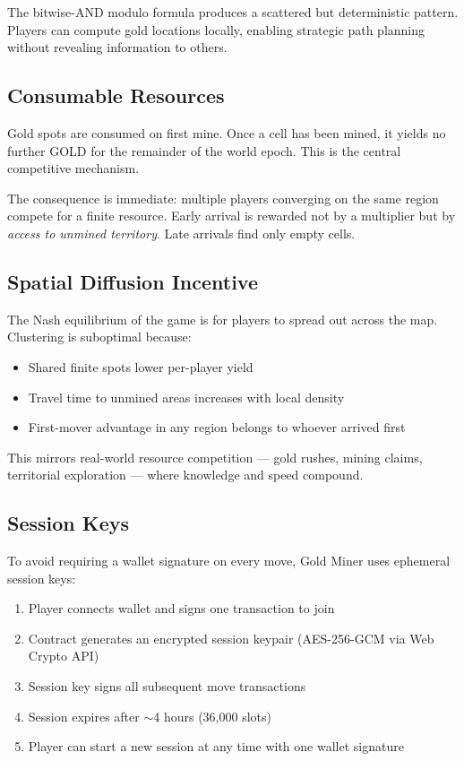 \documentclass[11pt,a4paper]{article}
\begin{document}
The bitwise-AND modulo formula produces a scattered but deterministic pattern. Players can compute gold locations locally, enabling strategic path planning without revealing information to others.

\subsection{Consumable Resources}

Gold spots are consumed on first mine. Once a cell has been mined, it yields no further GOLD for the remainder of the world epoch. This is the central competitive mechanism.

The consequence is immediate: multiple players converging on the same region compete for a finite resource. Early arrival is rewarded not by a multiplier but by \textit{access to unmined territory}. Late arrivals find only empty cells.

\subsection{Spatial Diffusion Incentive}

The Nash equilibrium of the game is for players to spread out across the map. Clustering is suboptimal because:

\begin{itemize}[leftmargin=2em]
\item Shared finite spots lower per-player yield
\item Travel time to unmined areas increases with local density
\item First-mover advantage in any region belongs to whoever arrived first
\end{itemize}

This mirrors real-world resource competition --- gold rushes, mining claims, territorial exploration --- where knowledge and speed compound.

\subsection{Session Keys}

To avoid requiring a wallet signature on every move, Gold Miner uses ephemeral session keys:

\begin{enumerate}[leftmargin=2em]
\item Player connects wallet and signs one transaction to join
\item Contract generates an encrypted session keypair (AES-256-GCM via Web Crypto API)
\item Session key signs all subsequent move transactions
\item Session expires after $\sim$4 hours (36,000 slots)
\item Player can start a new session at any time with one wallet signature
\end{enumerate}
\end{document}
